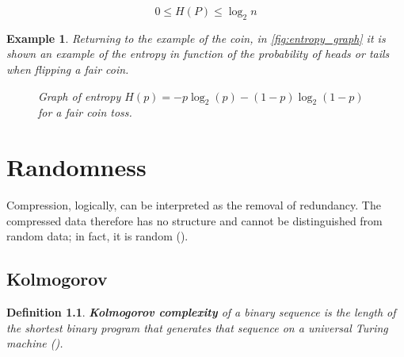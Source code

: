 \documentclass[12pt, a4paper]{report}
\newtheorem{definition}{Definition}[section] %
\newtheorem{example}{Example}
\begin{document}
\begin{equation} \label{eq:entropy_bounds}
  0 \leq H(P) \leq \log_2 n
\end{equation}

\begin{example}
Returning to the example of the coin, in \autoref{fig:entropy_graph} it is shown an example of the entropy in function of the
probability of heads or tails when flipping a fair coin.

\begin{figure}[H]
  \centering
    \caption{\label{fig:entropy_graph} Graph of entropy \( H(p) = -p \log_2(p) - (1-p) \log_2(1-p) \) for a fair coin toss.}
\end{figure}
\end{example}

\chapter{Randomness}

Compression, logically, can be interpreted as the removal of redundancy. The compressed data therefore has no structure and cannot
be distinguished from random data; in fact, it is random (\cite{AConciseIntroductionToDataCompression}).

\section{Kolmogorov}


\begin{definition}
\textbf{Kolmogorov complexity} of a binary sequence is the length of the shortest binary program that generates that sequence on a
universal Turing machine (\cite{ThreeApproachesToTheQuantitativeDefinitionOfInformation}).
\end{definition}
\end{document}
